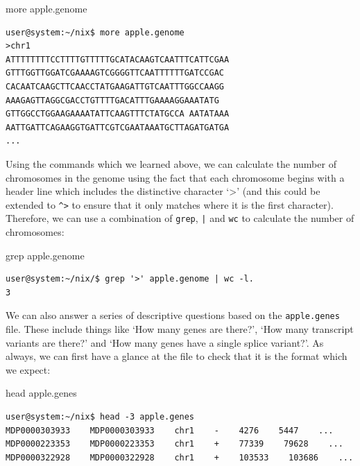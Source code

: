 \documentclass[11pt]{article}
\begin{document}
\begin{listing}[H]
\caption{more apple.genome}\vspace{-0.1in}
\begin{verbatim}
user@system:~/nix$ more apple.genome
>chr1
ATTTTTTTTCCTTTTGTTTTTGCATACAAGTCAATTTCATTCGAA
GTTTGGTTGGATCGAAAAGTCGGGGTTCAATTTTTTGATCCGAC
CACAATCAAGCTTCAACCTATGAAGATTGTCAATTTGGCCAAGG
AAAGAGTTAGGCGACCTGTTTTGACATTTGAAAAGGAAATATG
GTTGGCCTGGAAGAAAATATTCAAGTTTCTATGCCA AATATAAA
AATTGATTCAGAAGGTGATTCGTCGAATAAATGCTTAGATGATGA
...
\end{verbatim}
\end{listing}

Using the commands which we learned above, we can calculate the number of chromosomes in the genome using the fact that each chromosome begins with a header line which includes the distinctive character `>' (and this could be extended to \texttt{\^{}>} to ensure that it only matches where it is the first character). Therefore, we can use a combination of \texttt{grep}, \texttt{|} and \texttt{wc} to calculate the number of chromosomes:\\

\begin{listing}[H]
\caption{grep apple.genome}\vspace{-0.1in}
\begin{verbatim}
user@system:~/nix/$ grep '>' apple.genome | wc -l. 
3
\end{verbatim}
\end{listing}

We can also answer a series of descriptive questions based on the \texttt{apple.genes} file. These include things like `How many genes are there?', `How many transcript variants are there?' and `How many genes have a single splice variant?'. As always, we can first have a glance at the file to check that it is the format which we expect: \\

\begin{listing}[H]
\caption{head apple.genes}\vspace{-0.1in}
\begin{verbatim}
user@system:~/nix$ head -3 apple.genes
MDP0000303933    MDP0000303933    chr1    -    4276    5447    ...
MDP0000223353    MDP0000223353    chr1    +    77339    79628    ...
MDP0000322928    MDP0000322928    chr1    +    103533    103686    ...
\end{verbatim}
\end{listing}
\end{document}
